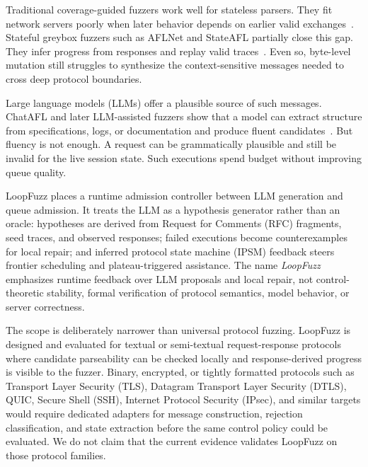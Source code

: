 \documentclass[final,5p,times,number]{elsarticle}
\begin{document}
Traditional coverage-guided fuzzers work well for stateless parsers. They fit network servers poorly when later behavior depends on earlier valid exchanges~\cite{directed_greybox_fuzzing_2017,seed_selection_successful_fuzzing_2021,one_fuzzing_strategy_rule_2022,regression_greybox_fuzzing_2021,efficient_errors_2022}. Stateful greybox fuzzers such as AFLNet and StateAFL partially close this gap. They infer progress from responses and replay valid traces~\cite{aflnet,stateafl,sgf_usenix22,profuzzbench_benchmark_stateful_protocol_2021,snapfuzz_high_throughput_fuzzing_2022,bleem_packet_sequence_2023,formatted_stateful_greybox_fuzzing_2024}. Even so, byte-level mutation still struggles to synthesize the context-sensitive messages needed to cross deep protocol boundaries.

Large language models (LLMs) offer a plausible source of such messages. ChatAFL and later LLM-assisted fuzzers show that a model can extract structure from specifications, logs, or documentation and produce fluent candidates~\cite{chatafl,fuzz4all_universal_fuzzing_large_2024,llmif_augmented_large_language_2024,matter_llm_specification_2024,carpetfuzz_documentation_2023,prompt_fuzzing_fuzz_driver_2024,large_language_models_are_2023,large_language_models_are_2024}. But fluency is not enough. A request can be grammatically plausible and still be invalid for the live session state. Such executions spend budget without improving queue quality.

LoopFuzz places a runtime admission controller between LLM generation and queue admission. It treats the LLM as a hypothesis generator rather than an oracle: hypotheses are derived from Request for Comments (RFC) fragments, seed traces, and observed responses; failed executions become counterexamples for local repair; and inferred protocol state machine (IPSM) feedback steers frontier scheduling and plateau-triggered assistance. The name \emph{LoopFuzz} emphasizes runtime feedback over LLM proposals and local repair, not control-theoretic stability, formal verification of protocol semantics, model behavior, or server correctness.

The scope is deliberately narrower than universal protocol fuzzing. LoopFuzz is designed and evaluated for textual or semi-textual request-response protocols where candidate parseability can be checked locally and response-derived progress is visible to the fuzzer. Binary, encrypted, or tightly formatted protocols such as Transport Layer Security (TLS), Datagram Transport Layer Security (DTLS), QUIC, Secure Shell (SSH), Internet Protocol Security (IPsec), and similar targets would require dedicated adapters for message construction, rejection classification, and state extraction before the same control policy could be evaluated. We do not claim that the current evidence validates LoopFuzz on those protocol families.
\end{document}
